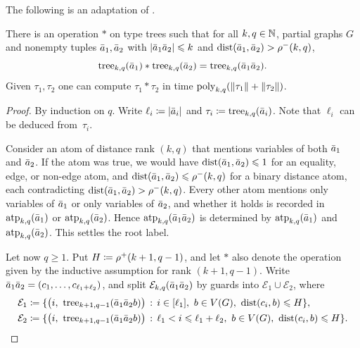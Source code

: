 The following is an adaptation of \cite[Lemma~3.1]{locality-note}.
\begin{lemma}\label{lem:compose}
There is an operation $\ast$ on type trees
such that for all \(k,q\in\mathbb N\), partial graphs \(G\) and
nonempty tuples $\bar a_1,\bar a_2$ with $|\bar a_1\bar a_2|\leqslant k$ and $\mathrm{dist}(\bar a_1,\bar a_2)>\rho^-(k,q)$,
\[
\mathrm{tree}_{k,q}(\bar a_1)\ast\mathrm{tree}_{k,q}(\bar a_2)
=
\mathrm{tree}_{k,q}(\bar a_1\bar a_2).
\]
Given $\tau_1,\tau_2$ one can compute $\tau_1\ast\tau_2$ in time $\mathrm{poly}_{k,q}(\lVert \tau_1\rVert+\lVert \tau_2\rVert)$.
\end{lemma}
\begin{proof}
By induction on $q$.
Write $\ell_i\coloneqq|\bar a_i|$ and $\tau_i\coloneqq\mathrm{tree}_{k,q}(\bar a_i)$. Note that \(\ell_i\) can be deduced from~$\tau_i$.

Consider an atom of distance rank $(k,q)$ that mentions variables of both $\bar a_1$ and $\bar a_2$.
If the atom was true, we would have $\mathrm{dist}(\bar a_1,\bar a_2)\leqslant1$ for an equality, edge, or non-edge atom, and $\mathrm{dist}(\bar a_1,\bar a_2)\leqslant\rho^-(k,q)$ for a binary distance atom, each contradicting $\mathrm{dist}(\bar a_1,\bar a_2)>\rho^-(k,q)$.
Every other atom mentions only variables of $\bar a_1$ or only variables of $\bar a_2$, and whether it holds is recorded in $\textnormal{atp}_{k,q}(\bar a_1)$ or $\textnormal{atp}_{k,q}(\bar a_2)$.
Hence $\textnormal{atp}_{k,q}(\bar a_1\bar a_2)$ is determined by $\textnormal{atp}_{k,q}(\bar a_1)$ and $\textnormal{atp}_{k,q}(\bar a_2)$.
This settles the root label.

Let now \(q \ge 1\).
Put $H\coloneqq\rho^+(k+1,q-1)$, and let $\ast$ also denote the operation given by the inductive assumption for rank $(k+1,q-1)$.
Write $\bar a_1\bar a_2=(c_1,\ldots,c_{\ell_1+\ell_2})$, and split $\mathcal E_{k,q}(\bar a_1\bar a_2)$ by guards into $\mathcal E_1\cup\mathcal E_2$, where
\begin{align*}
\mathcal E_1&\coloneqq\{\bigl(i,\ \mathrm{tree}_{k+1,q-1}(\bar a_1\bar a_2 b)\bigr) \,:\, i\in[\ell_1],\ b\in V(G),\ \mathrm{dist}(c_i,b)\leqslant H \},\\
\mathcal E_2&\coloneqq\{\bigl(i,\ \mathrm{tree}_{k+1,q-1}(\bar a_1\bar a_2 b)\bigr) \,:\, \ell_1<i\leqslant\ell_1+\ell_2,\ b\in V(G),\ \mathrm{dist}(c_i,b)\leqslant H \}.
\end{align*}


\end{proof}
